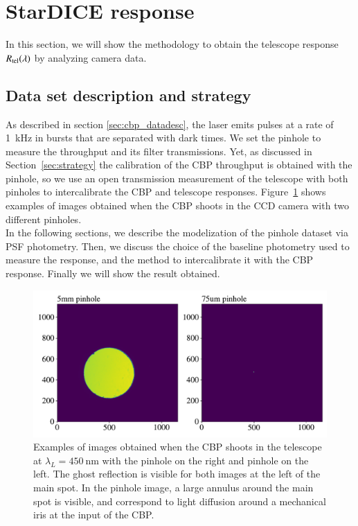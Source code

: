 \section{StarDICE response}
\label{sec:rsd}

In this section, we will show the methodology to obtain the \SD telescope response $R_{\mathrm{tel}}(\lambda)$ by analyzing \SD camera data.

\subsection{Data set description and strategy}
\label{sec:sd_datadesc}

As described in section \ref{sec:cbp_datadesc}, the laser emits pulses at a rate of \SI{1}{\kilo\hertz} in bursts that are separated with dark times. We set the \spinhole pinhole to measure the \SD throughput and its filter transmissions. Yet, as discussed in Section~\ref{sec:strategy} the calibration of the CBP throughput is obtained with the \bpinhole pinhole, so we use an open transmission measurement of the \SD telescope with both pinholes to intercalibrate the CBP and \SD telescope responses. Figure~\ref{fig:ccd_examples} shows examples of images obtained when the CBP shoots in the \SD CCD camera with two different pinholes. \\

In the following sections, we describe the modelization of the \spinhole pinhole dataset via PSF photometry. Then, we discuss the choice of the baseline photometry used to measure the \SD response, and the method to intercalibrate it with the CBP response. Finally we will show the result obtained.

\begin{figure}[h]
    \centering
    \includegraphics[width=\columnwidth]{fig/ccd_examples.pdf}
    \caption{Examples of images obtained when the CBP shoots in the \SD telescope at $\lambda_L=\SI{450}{\nm}$ with the \bpinhole pinhole on the right and \spinhole pinhole on the left. The ghost reflection is visible for both images at the left of the main spot. In the \bpinhole pinhole image, a large annulus around the main spot is visible, and correspond to light diffusion around a mechanical iris at the input of the CBP.}
    \label{fig:ccd_examples}
\end{figure}

